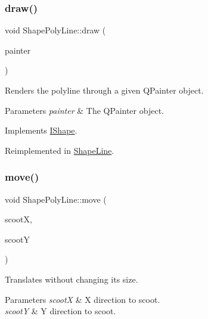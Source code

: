 \mbox{\label{class_shape_poly_line_a6aaca4bd2767644f9ea0f68065fa1f98}} 
\subsubsection{\texorpdfstring{draw()}{draw()}}
{\footnotesize\ttfamily void Shape\+Poly\+Line\+::draw (\begin{DoxyParamCaption}\item[{Q\+Painter \&}]{painter }\end{DoxyParamCaption})\hspace{0.3cm}{\ttfamily [virtual]}}



Renders the polyline through a given Q\+Painter object. 


\begin{DoxyParams}{Parameters}
{\em painter} & The Q\+Painter object. \\
\hline
\end{DoxyParams}


Implements \mbox{\hyperlink{class_i_shape_ad97c626e7e2c9afb9f51efc41b836e6f}{I\+Shape}}.



Reimplemented in \mbox{\hyperlink{class_shape_line_a8b4dbfe05387934a0f9c4a053a798239}{Shape\+Line}}.

\mbox{\label{class_shape_poly_line_a7c1971596b171c4c08ec5657b6592354}} 
\subsubsection{\texorpdfstring{move()}{move()}}
{\footnotesize\ttfamily void Shape\+Poly\+Line\+::move (\begin{DoxyParamCaption}\item[{int}]{scootX,  }\item[{int}]{scootY }\end{DoxyParamCaption})\hspace{0.3cm}{\ttfamily [virtual]}}



Translates without changing its size. 


\begin{DoxyParams}{Parameters}
{\em scootX} & X direction to scoot. \\
\hline
{\em scootY} & Y direction to scoot. \\
\hline
\end{DoxyParams}


